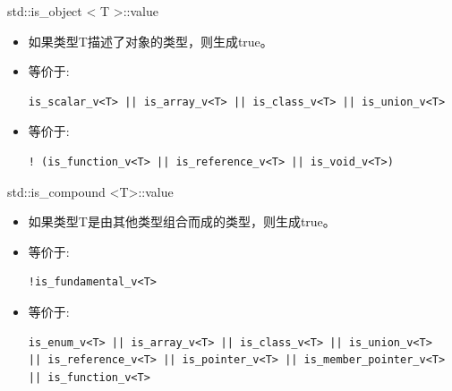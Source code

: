 std::is\_object < T >::value

\begin{itemize}
\item 
如果类型T描述了对象的类型，则生成true。

\item 
等价于: 
\begin{lstlisting}[style=styleCXX]
is_scalar_v<T> || is_array_v<T> || is_class_v<T> || is_union_v<T>
\end{lstlisting}

\item
等价于: 
\begin{lstlisting}[style=styleCXX]
! (is_function_v<T> || is_reference_v<T> || is_void_v<T>)
\end{lstlisting}
\end{itemize}

std::is\_compound <T>::value

\begin{itemize}
\item 
如果类型T是由其他类型组合而成的类型，则生成true。

\item 
等价于: 
\begin{lstlisting}[style=styleCXX]
!is_fundamental_v<T>
\end{lstlisting}

\item
等价于: 
\begin{lstlisting}[style=styleCXX]
is_enum_v<T> || is_array_v<T> || is_class_v<T> || is_union_v<T>
|| is_reference_v<T> || is_pointer_v<T> || is_member_pointer_v<T>
|| is_function_v<T>
\end{lstlisting}
\end{itemize}



